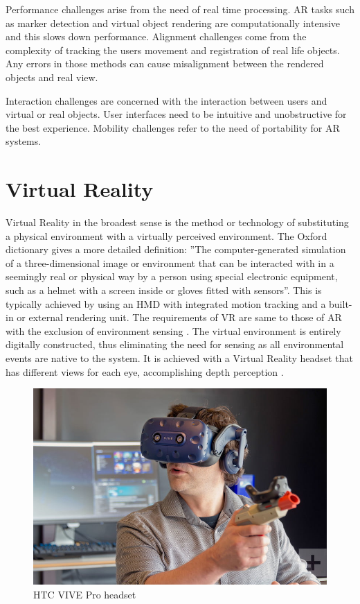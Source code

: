 \documentclass[12pt, a4paper,oneside, nocenter]{thesis}
\begin{document}
Performance challenges arise from the need of real time processing. AR tasks such as marker detection
and virtual object rendering are computationally intensive and this slows down performance.
Alignment challenges come from the complexity of tracking the users movement and registration of real
life objects. Any errors in those methods can cause misalignment between the rendered objects and
real view.\par
Interaction challenges are concerned with the interaction between users and virtual or real objects.
User interfaces need to be intuitive and unobstructive for the best experience. Mobility challenges refer
to the need of portability for AR systems.
\\
\section{Virtual Reality}
Virtual Reality in the broadest sense is the method or technology of substituting a physical environment with a virtually perceived environment. The Oxford dictionary gives a more detailed definition: 
''The computer-generated simulation of a three-dimensional image or environment that can be interacted with in a seemingly real or physical way by a person using special electronic equipment, such as a helmet with a screen inside or gloves fitted with sensors''.
This is typically achieved by using an HMD with integrated motion tracking and a built-in or external rendering unit.
The requirements of VR are same to those of AR with the exclusion of environment sensing . The virtual environment
is entirely digitally constructed, thus eliminating the need for sensing as all environmental events are native to the system. It is achieved with a Virtual Reality headset that has different views for each eye, accomplishing depth perception .
\begin{figure}[H]
	\includegraphics[width=\textwidth]{htc-vive-pro-headset}
	\caption{HTC VIVE Pro headset \citeyearpar{htc-vive-pro-review}}
	\label{fig:htc-vive-pro-headset}
\end{figure}
\end{document}

